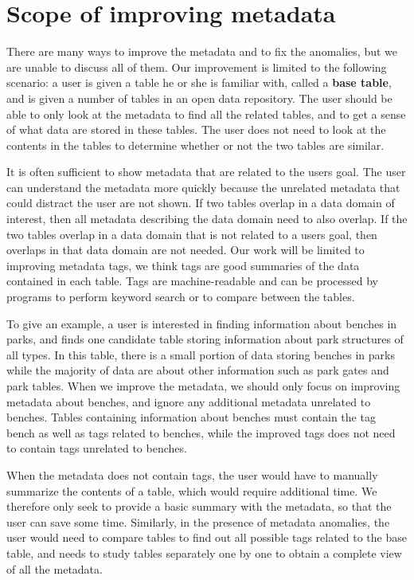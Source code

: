 \section{Scope of improving metadata}
\label{sec:ScopeOfImprovingMetadata}

There are many ways to improve the metadata and to fix the anomalies, but we are unable to discuss all of them. Our improvement is limited to the following scenario: a user is given a table he or she is familiar with, called a \textbf{\gls{base table}}, and is given a number of tables in an open data repository. The user should be able to only look at the metadata to find all the related tables, and to get a sense of what data are stored in these tables. The user does not need to look at the contents in the tables to determine whether or not the two tables are similar.

It is often sufficient to show metadata that are related to the users goal. The user can understand the metadata more quickly because the unrelated metadata that could distract the user are not shown. If two tables overlap in a data domain of interest, then all metadata describing the data domain need to also overlap. If the two tables overlap in a data domain that is not related to a users goal, then overlaps in that data domain are not needed. Our work will be limited to improving metadata tags, we think tags are good summaries of the data contained in each table. Tags are machine-readable and can be processed by programs to perform keyword search or to compare between the tables.

To give an example, a user is interested in finding information about benches in parks, and finds one candidate table storing information about park structures of all types. In this table, there is a small portion of data storing benches in parks while the majority of data are about other information such as park gates and park tables. When we improve the metadata, we should only focus on improving metadata about benches, and ignore any additional metadata unrelated to benches. Tables containing information about benches must contain the tag bench as well as tags related to benches, while the improved tags does not need to contain tags unrelated to benches.

When the metadata does not contain tags, the user would have to manually summarize the contents of a table, which would require additional time. We therefore only seek to provide a basic summary with the metadata, so that the user can save some time. Similarly, in the presence of metadata anomalies, the user would need to compare tables to find out all possible tags related to the base table, and needs to study tables separately one by one to obtain a complete view of all the metadata.

